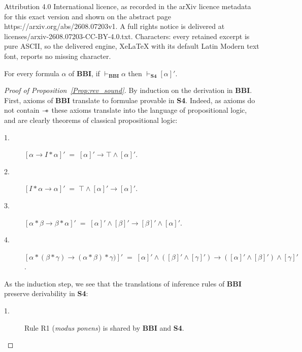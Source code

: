 \documentclass[10pt,a4paper]{amsart}
\newcommand\magicwand{\mathrel{-\mkern-6mu*}}
\newcommand{\BBI}{\textbf{BBI}\xspace}
\newcommand{\SFour}{\textbf{S4}\xspace}
\begin{document}
Attribution 4.0 International licence, as recorded in the arXiv licence metadata for this exact version and shown on the abstract page https://arxiv.org/abs/2608.07203v1. A full rights notice is delivered at licenses/arxiv-2608.07203-CC-BY-4.0.txt. Characters: every retained excerpt is pure ASCII, so the delivered engine, XeLaTeX with its default Latin Modern text font, reports no missing character.
\begin{proposition}
\label{Prop:rev_sound}
For every formula $\alpha$ of \BBI, if $\vdash_{\BBI} \alpha$ then $\vdash_{\SFour} [\alpha]'$.
\end{proposition}

\begin{proof}[Proof of Proposition~\ref{Prop:rev_sound}]
    By induction on the derivation in \BBI. First, axioms of \BBI translate to formulae provable in \SFour. Indeed, as axioms do not contain $\magicwand$ these axioms translate into the language of propositional logic, and are clearly theorems of classical propositional logic:

  \begin{description}

   \item[1.] $[\alpha \rightarrow I*\alpha]' \;=\; [\alpha]' \rightarrow \top\land[\alpha]'$.

    \item[2.] $[I*\alpha \rightarrow \alpha]' \;=\; \top \land [\alpha]' \rightarrow [\alpha]'$.

    \item[3.] $[\alpha*\beta\rightarrow\beta*\alpha]' \;=\; [\alpha]' \land [\beta]'\rightarrow[\beta]' \land [\alpha]'$.

    \item[4.] $[\alpha*(\beta*\gamma) \rightarrow (\alpha *\beta) * \gamma)]' \;=\; [\alpha]' \land ([\beta]' \land [\gamma]') \rightarrow ([\alpha]' \land [\beta]') \land [\gamma]'$.



  \end{description}

    As the induction step, we see that the translations of inference rules of \BBI preserve derivability in \SFour:

\begin{description}

    \item[1.] Rule R1 (\textit{modus ponens}) is shared by \BBI and \SFour.


\end{description}
\end{proof}
\end{document}
